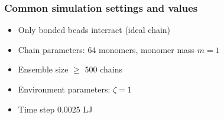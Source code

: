 \documentclass[handout]{beamer}
\begin{document}
\begin{frame}
    \frametitle{Common simulation settings and values}

    \begin{itemize}
        \item Only bonded beads interract (ideal chain)
        \item Chain parameters: 64 monomers, monomer mass $m=1$
        \item Ensemble size $ \ge $ 500 chains
        \item Environment parameters: $\zeta=1$
        \item Time step 0.0025 LJ
    \end{itemize}

\end{frame}
\end{document}
